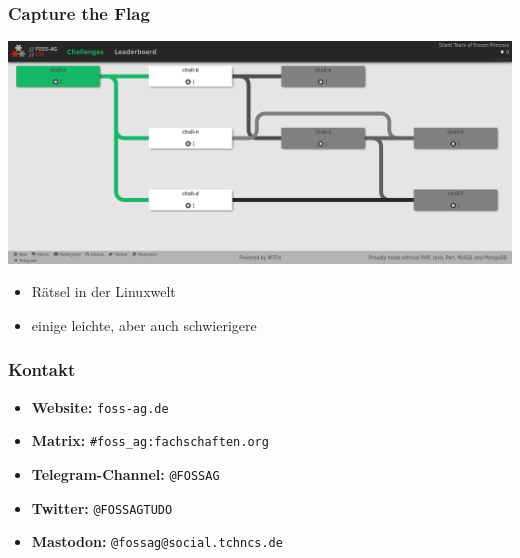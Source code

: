 \documentclass[12pt,utf8]{beamer}
\begin{document}
	\begin{frame}
		\frametitle{Capture the Flag}
		\includegraphics[width=\linewidth]{resources/screenshot_ctf.png}
		\begin{itemize}
			\item Rätsel in der Linuxwelt\\
			\vspace{0.5cm}
			\item einige leichte, aber auch schwierigere
		\end{itemize}
	\end{frame}
	
	\begin{frame}
		\frametitle{Kontakt}

		
		\begin{itemize}%
			\item \textbf{Website:} \texttt{foss-ag.de}
			\vspace{0.5cm}
			\item \textbf{Matrix:} \texttt{\#foss\_ag:fachschaften.org}
			\vspace{0.5cm}
			\item \textbf{Telegram-Channel:} \texttt{@FOSSAG}
			\vspace{0.5cm}
			\item \textbf{Twitter:} \texttt{@FOSSAGTUDO}
			\vspace{0.5cm}
			\item \textbf{Mastodon:} \texttt{@fossag@social.tchncs.de}	
			
		\end{itemize}
	\end{frame}
\end{document}
